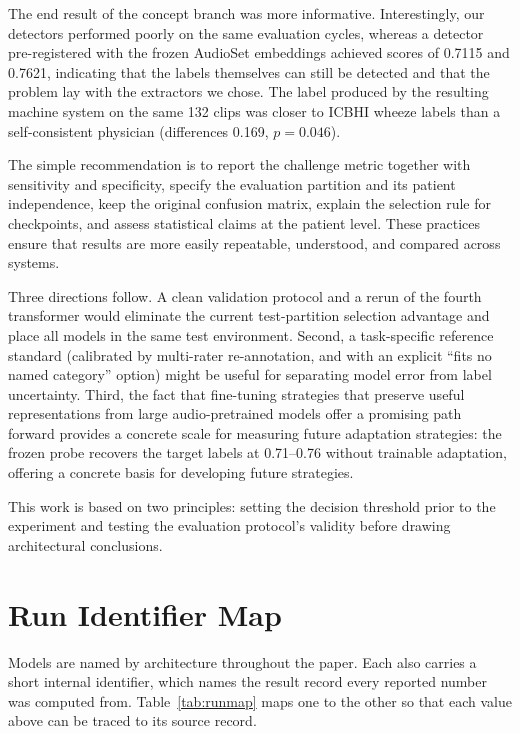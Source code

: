 \documentclass[journal,onecolumn]{IEEEtran}
\begin{document}
The end result of the concept branch was more informative. Interestingly, our detectors performed poorly on the same evaluation cycles, whereas a detector pre-registered with the frozen AudioSet embeddings achieved scores of 0.7115 and 0.7621, indicating that the labels themselves can still be detected and that the problem lay with the extractors we chose. The label produced by the resulting machine system on the same 132 clips was closer to ICBHI wheeze labels than a self-consistent physician (differences 0.169, $p=0.046$).

The simple recommendation is to report the challenge metric together with sensitivity and specificity, specify the evaluation partition and its patient independence, keep the original confusion matrix, explain the selection rule for checkpoints, and assess statistical claims at the patient level. These practices ensure that results are more easily repeatable, understood, and compared across systems.

Three directions follow. A clean validation protocol and a rerun of the fourth transformer would eliminate the current test-partition selection advantage and place all models in the same test environment. Second, a task-specific reference standard (calibrated by multi-rater re-annotation, and with an explicit ``fits no named category'' option) might be useful for separating model error from label uncertainty. Third, the fact that fine-tuning strategies that preserve useful representations from large audio-pretrained models offer a promising path forward provides a concrete scale for measuring future adaptation strategies: the frozen probe recovers the target labels at 0.71--0.76 without trainable adaptation, offering a concrete basis for developing future strategies.

This work is based on two principles: setting the decision threshold prior to the experiment and testing the evaluation protocol's validity before drawing architectural conclusions.

\appendices
\section{Run Identifier Map}
\label{app:runmap}

Models are named by architecture throughout the paper. Each also carries a short internal
identifier, which names the result record every reported number was computed from.
Table~\ref{tab:runmap} maps one to the other so that each value above can be traced to its
source record.
\end{document}
